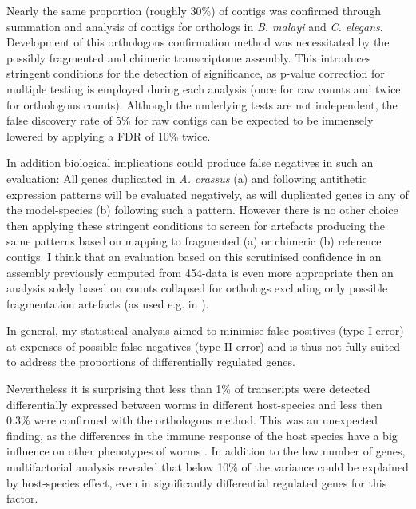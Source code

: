 Nearly the same proportion (roughly 30\%) of contigs was confirmed
through summation and analysis of contigs for orthologs in
\textit{B. malayi} and \textit{C. elegans}. Development of this
orthologous confirmation method was necessitated by the possibly
fragmented and chimeric transcriptome assembly. This introduces
stringent conditions for the detection of significance, as p-value
correction for multiple testing is employed during each analysis (once
for raw counts and twice for orthologous counts). Although the
underlying tests are not independent, the false discovery rate of 5\%
for raw contigs can be expected to be immensely lowered by applying a
FDR of 10\% twice.

In addition biological implications could produce false negatives in
such an evaluation: All genes duplicated in \textit{A. crassus} (a)
and following antithetic expression patterns will be evaluated
negatively, as will duplicated genes in any of the model-species (b)
following such a pattern. However there is no other choice then
applying these stringent conditions to screen for artefacts producing
the same patterns based on mapping to fragmented (a) or chimeric (b)
reference contigs. I think that an evaluation based on this
scrutinised confidence in an assembly previously computed from
454-data is even more appropriate then an analysis solely based on
counts collapsed for orthologs excluding only possible fragmentation
artefacts (as used e.g. in \cite{pmid22084086}).

In general, my statistical analysis aimed to minimise false positives
(type I error) at expenses of possible false negatives (type II error)
and is thus not fully suited to address the proportions of
differentially regulated genes.

Nevertheless it is surprising that less than 1\% of transcripts were
detected differentially expressed between worms in different
host-species and less then 0.3\% were confirmed with the orthologous
method. This was an unexpected finding, as the differences in the
immune response of the host species have a big influence on other
phenotypes of worms \cite{knopf_swimbladder_2006}. In addition to the
low number of genes, multifactorial analysis revealed that below 10\%
of the variance could be explained by host-species effect, even in
significantly differential regulated genes for this factor.

